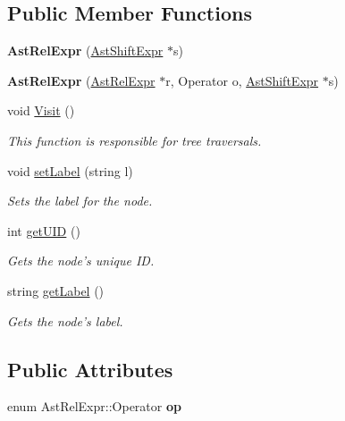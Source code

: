 \subsection*{Public Member Functions}
\begin{DoxyCompactItemize}
\item 
\hypertarget{classAstRelExpr_a17bddafe8d750f50ae41eb9c87410b1e}{{\bfseries Ast\-Rel\-Expr} (\hyperlink{classAstShiftExpr}{Ast\-Shift\-Expr} $\ast$s)}\label{classAstRelExpr_a17bddafe8d750f50ae41eb9c87410b1e}

\item 
\hypertarget{classAstRelExpr_a7a8c51e92d85456cd8da5b426f6958cf}{{\bfseries Ast\-Rel\-Expr} (\hyperlink{classAstRelExpr}{Ast\-Rel\-Expr} $\ast$r, Operator o, \hyperlink{classAstShiftExpr}{Ast\-Shift\-Expr} $\ast$s)}\label{classAstRelExpr_a7a8c51e92d85456cd8da5b426f6958cf}

\item 
void \hyperlink{classAstRelExpr_ae1a3ad7c0ce7a205222ec0b1de5ee884}{Visit} ()
\begin{DoxyCompactList}\small\item\em This function is responsible for tree traversals. \end{DoxyCompactList}\item 
void \hyperlink{classAST_a71d680856e95ff89f55d5311a552eba6}{set\-Label} (string l)
\begin{DoxyCompactList}\small\item\em Sets the label for the node. \end{DoxyCompactList}\item 
int \hyperlink{classAST_ab7a5b1d9f1c2de0d98deb356f724a42c}{get\-U\-I\-D} ()
\begin{DoxyCompactList}\small\item\em Gets the node's unique I\-D. \end{DoxyCompactList}\item 
string \hyperlink{classAST_aee029be902fffc927d16ccb03eb922ad}{get\-Label} ()
\begin{DoxyCompactList}\small\item\em Gets the node's label. \end{DoxyCompactList}\end{DoxyCompactItemize}
\subsection*{Public Attributes}
\begin{DoxyCompactItemize}
\item 
\hypertarget{classAstRelExpr_abe0b0000f35f1e02a8999c61e6c8f48b}{enum Ast\-Rel\-Expr\-::\-Operator {\bfseries op}}\label{classAstRelExpr_abe0b0000f35f1e02a8999c61e6c8f48b}

\end{DoxyCompactItemize}
